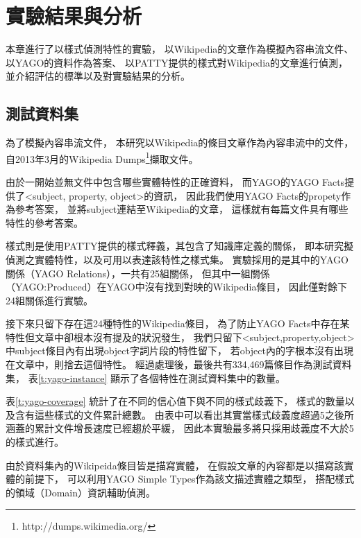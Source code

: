 %
%
%
\chapter{實驗結果與分析}
\label{c:exp}

本章進行了以樣式偵測特性的實驗，
以Wikipedia的文章作為模擬內容串流文件、
以YAGO的資料作為答案、
以PATTY提供的樣式對Wikipedia的文章進行偵測，
並介紹評估的標準以及對實驗結果的分析。

\section{測試資料集}
\label{s:dataset}

為了模擬內容串流文件，
本研究以Wikipedia的條目文章作為內容串流中的文件，
自2013年3月的Wikipedia Dumps\footnote{http://dumps.wikimedia.org/}擷取文件。

由於一開始並無文件中包含哪些實體特性的正確資料，
而YAGO的YAGO Facts提供了<subject, property, object>的資訊，
因此我們使用YAGO Facts的propety作為參考答案，
並將subject連結至Wikipedia的文章，
這樣就有每篇文件具有哪些特性的參考答案。

樣式則是使用PATTY提供的樣式釋義，其包含了知識庫定義的關係，
即本研究擬偵測之實體特性，以及可用以表達該特性之樣式集。
實驗採用的是其中的YAGO關係（YAGO Relations），一共有25組關係，
但其中一組關係（YAGO:Produced）在YAGO中沒有找到對映的Wikipedia條目，
因此僅對餘下24組關係進行實驗。

接下來只留下存在這24種特性的Wikipedia條目，
為了防止YAGO Facts中存在某特性但文章中卻根本沒有提及的狀況發生，
我們只留下<subject,property,object>中subject條目內有出現object字詞片段的特性留下，
若object內的字根本沒有出現在文章中，則捨去這個特性。
經過處理後，最後共有334,469篇條目作為測試資料集，
表\ref{t:yago-instance} 顯示了各個特性在測試資料集中的數量。



表\ref{t:yago-coverage} 統計了在不同的信心值下與不同的樣式歧義下，
樣式的數量以及含有這些樣式的文件累計總數。
由表中可以看出其實當樣式歧義度超過5之後所涵蓋的累計文件增長速度已經趨於平緩，
因此本實驗最多將只採用歧義度不大於5的樣式進行。



由於資料集內的Wikipeida條目皆是描寫實體，
在假設文章的內容都是以描寫該實體的前提下，
可以利用YAGO Simple Types作為該文描述實體之類型，
搭配樣式的領域（Domain）資訊輔助偵測。

